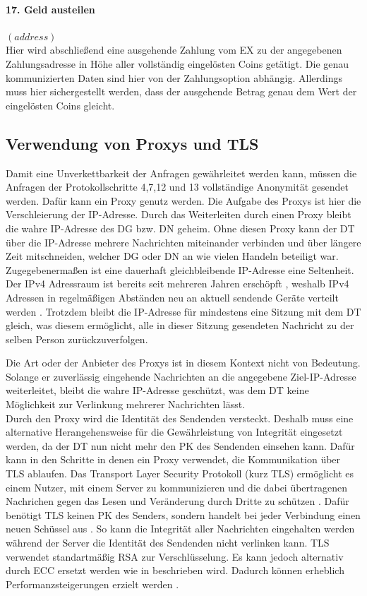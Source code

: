 \documentclass[
	fontsize=11pt,
	headings=small,
	parskip=half,           %
	bibliography=totoc,
	numbers=noenddot,       %
	open=any,               %
]{scrreprt}
\begin{document}
\paragraph{17. Geld austeilen} $(address)$\\
Hier wird abschließend eine ausgehende Zahlung vom EX zu der angegebenen Zahlungsadresse in Höhe aller vollständig eingelösten Coins getätigt. Die genau kommunizierten Daten sind hier von der Zahlungsoption abhängig. Allerdings muss hier sichergestellt werden, dass der ausgehende Betrag genau dem Wert der eingelösten Coins gleicht.

\subsection{Verwendung von Proxys und TLS}
Damit eine Unverkettbarkeit der Anfragen gewährleitet werden kann, müssen die Anfragen der Protokollschritte 4,7,12 und 13 vollständige Anonymität gesendet werden. Dafür kann ein Proxy genutz werden. Die Aufgabe des Proxys ist hier die Verschleierung der IP-Adresse. Durch das Weiterleiten durch einen Proxy bleibt die wahre IP-Adresse des DG bzw. DN geheim. Ohne diesen Proxy kann der DT über die IP-Adresse mehrere Nachrichten miteinander verbinden und über längere Zeit mitschneiden, welcher DG oder DN an wie vielen Handeln beteiligt war. Zugegebenermaßen ist eine dauerhaft gleichbleibende IP-Adresse eine Seltenheit. Der IPv4 Adressraum ist bereits seit mehreren Jahren erschöpft \cite{tls-huston2008changing}, weshalb IPv4 Adressen in regelmäßigen Abständen neu an aktuell sendende Geräte verteilt werden \cite{tls-jin2007identifying}. Trotzdem bleibt die IP-Adresse für mindestens eine Sitzung mit dem DT gleich, was diesem ermöglicht, alle in dieser Sitzung gesendeten Nachricht zu der selben Person zurückzuverfolgen. 

Die Art oder der Anbieter des Proxys ist in diesem Kontext nicht von Bedeutung. Solange er zuverlässig eingehende Nachrichten an die angegebene Ziel-IP-Adresse weiterleitet, bleibt die wahre IP-Adresse geschützt, was dem DT keine Möglichkeit zur Verlinkung mehrerer Nachrichten lässt.\\

Durch den Proxy wird die Identität des Sendenden versteckt. Deshalb muss eine alternative Herangehensweise für die Gewährleistung von Integrität eingesetzt werden, da der DT nun nicht mehr den PK des Sendenden einsehen kann. Dafür kann in den Schritte in denen ein Proxy verwendet, die Kommunikation über TLS ablaufen. Das Transport Layer Security Protokoll (kurz TLS) ermöglicht es einem Nutzer, mit einem Server zu kommunizieren und die dabei übertragenen Nachrichen gegen das Lesen und Veränderung durch Dritte zu schützen \cite{tls-brumbaughssl}. Dafür benötigt TLS keinen PK des Senders, sondern handelt bei jeder Verbindung einen neuen Schüssel aus \cite{tls-Arfaoui2019The}. So kann die Integrität aller Nachrichten eingehalten werden während der Server die Identität des Sendenden nicht verlinken kann. TLS verwendet standartmäßig RSA zur Verschlüsselung. Es kann jedoch alternativ durch ECC ersetzt werden wie in \cite{tls-ecc-blake2006elliptic} beschrieben wird. Dadurch können erheblich Performanzsteigerungen erzielt werden \cite{tls-ecc-koschuch2012price}.
\end{document}
